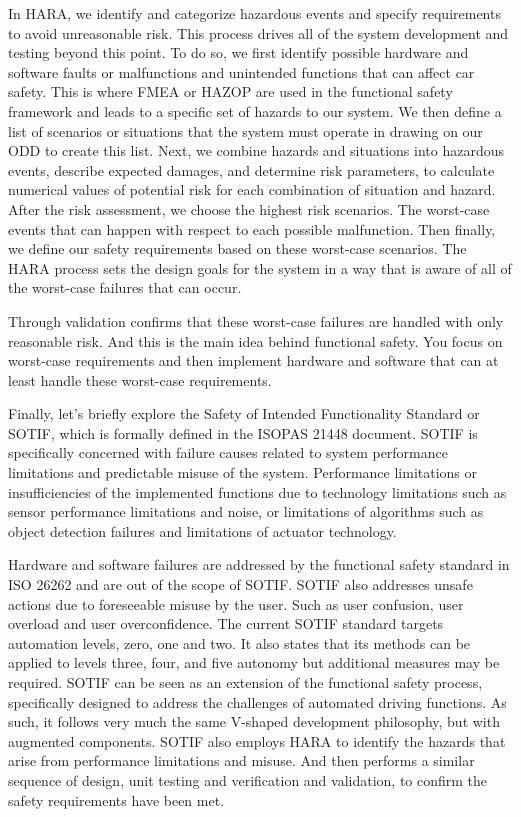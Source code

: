  In HARA, we identify and categorize hazardous events and specify requirements to avoid unreasonable risk. 
 This process drives all of the system development and testing beyond this point. To do so, we first identify possible hardware and software 
 faults or malfunctions and unintended functions that can affect car safety. 
 This is where FMEA or HAZOP are used in the functional safety framework and leads to a specific set of hazards to our system. 
 We then define a list of scenarios or situations that the system must operate in drawing on our ODD to create this list. 
 Next, we combine hazards and situations into hazardous events, describe expected damages, and determine risk parameters, to calculate 
 numerical values of potential risk for each combination of situation and hazard. 
 After the risk assessment, we choose the highest risk scenarios. 
 The worst-case events that can happen with respect to each possible malfunction. 
 Then finally, we define our safety requirements based on these worst-case scenarios. 
 The HARA process sets the design goals for the system in a way that is aware of all of the worst-case failures that can occur. 
 
 Through validation confirms that these worst-case failures are handled with only reasonable risk. 
 And this is the main idea behind functional safety. You focus on worst-case requirements and then implement hardware and software that can at least 
 handle these worst-case requirements. 
 
 Finally, let's briefly explore the Safety of Intended Functionality Standard or SOTIF, which is formally defined in the ISOPAS 21448 document. 
 SOTIF is specifically concerned with failure causes related to system performance limitations and predictable misuse of the system. 
 Performance limitations or insufficiencies of the implemented functions due to technology limitations such as 
 sensor performance limitations and noise, or limitations of algorithms such as 
 object detection failures and limitations of actuator technology. 
 
 Hardware and software failures are addressed by the functional safety standard in ISO 26262 and are out of the scope of SOTIF. 
 SOTIF also addresses unsafe actions due to foreseeable misuse by the user. Such as user confusion, user overload and user overconfidence. 
 The current SOTIF standard targets automation levels, zero, one and two. It also states that its methods can be applied to levels three, four, and five autonomy 
 but additional measures may be required. SOTIF can be seen as an extension of the functional safety process, specifically designed to address the challenges of 
 automated driving functions. As such, it follows very much the same V-shaped development philosophy, but with augmented components. 
 SOTIF also employs HARA to identify the hazards that arise from performance limitations and misuse. 
 And then performs a similar sequence of design, unit testing and verification and validation, to confirm 
 the safety requirements have been met. 
 


